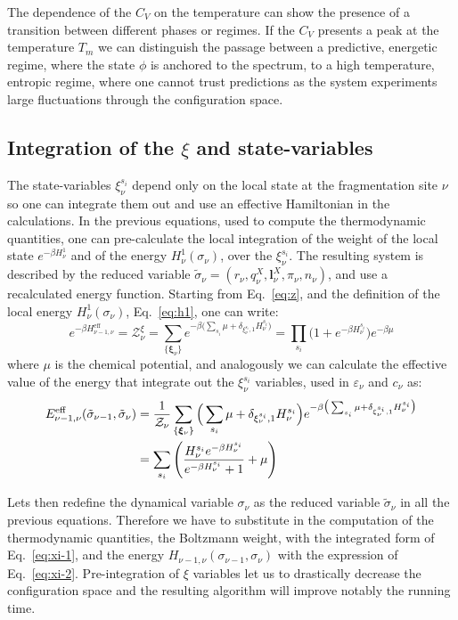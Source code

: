 The dependence of the $C_V$ on the temperature can show the presence of a
transition between different phases or regimes. 
If the $C_V$ presents a peak at the temperature $T_m$ we can distinguish 
the passage between a
predictive, energetic regime, where the state $\phi$ is anchored to the
spectrum, to a high temperature, entropic regime, where one cannot trust
predictions as the system experiments large fluctuations through the
configuration space.


\subsection{Integration of the $\xi$ and state-variables}

The state-variables $\xi_\nu^{s_i}$ depend only on the local state at the
fragmentation site $\nu$ so one can integrate them out and use an effective
Hamiltonian in the calculations.
In the previous equations, used to compute the thermodynamic quantities, one
can pre-calculate the local integration of the weight of the local state
 $e^{-\beta H^1_\nu}$  and
of the energy $H_\nu^1(\sigma_\nu)$, over the $\xi_\nu^{s_i}$.
The resulting system is described by 
the reduced variable $\tilde \sigma_\nu=(r_\nu,q^X_\nu,\bm
l^X_\nu,\pi_\nu,n_\nu)$, and use a
recalculated energy function.
Starting from Eq.~\ref{eq:z}, and the definition of the local energy
$H^1_\nu(\sigma_\nu)$, Eq.~\ref{eq:h1}, one can write:
\begin{equation}
e^{-\beta H_{\nu-1,\nu}^\text{eff}}=
\mathcal Z_\nu^\xi=
\sum_{\lbrace\bm\xi_\nu\rbrace}
e^{-\beta\big(\sum_{s_i}\mu+\delta_{\xi^{s_i}_\nu,1} H^{s_i}_\nu\big)}=
\prod_{s_i} \Big(1+e^{-\beta H^{s_i}_\nu}\Big)
e^{-\beta\mu}
\label{eq:xi-1}
\end{equation}
where $\mu$ is the chemical potential,
and analogously we can calculate the effective value of the energy that
integrate out the $\xi_\nu^{s_i}$ variables, used in $\varepsilon_\nu$ and
$c_\nu$ as:
\begin{align}
E_{\nu-1,\nu}^\text{eff}(\tilde\sigma_{\nu-1},\tilde\sigma_\nu) &=
\frac 1{\cal Z_\nu}
\sum_{\lbrace\bm \xi_\nu\rbrace} 
\Big(\sum_{s_i}	\mu+\delta_{\xi^{s_i}_\nu,1} H^{s_i}_\nu \Big)
e^{-\beta  \big(\sum_{s_i}\mu+ \delta_{\xi^{s_i}_\nu,1} H^{s_i}_\nu\big)}
\nonumber\\
&=
\sum_{s_i}\Bigg(\frac{H_\nu^{s_i} e^{-\beta H_\nu^{s_i}}}
{e^{-\beta H_\nu^{s_i}}+1}+\mu\Bigg)
\label{eq:xi-2}
\end{align}

Lets then redefine the dynamical variable $\sigma_\nu$ as the reduced variable
$\tilde \sigma_\nu$ in all the previous equations.
Therefore we have to substitute in the computation of the thermodynamic 
quantities, the Boltzmann weight, with the integrated form of Eq.~\ref{eq:xi-1},
and the energy $H_{\nu-1,\nu}(\sigma_{\nu-1},\sigma_\nu)$ with the expression of 
Eq.~\ref{eq:xi-2}.
Pre-integration of $\xi$ variables
let us to drastically decrease the configuration space and the resulting
algorithm will improve notably the running time.
 


